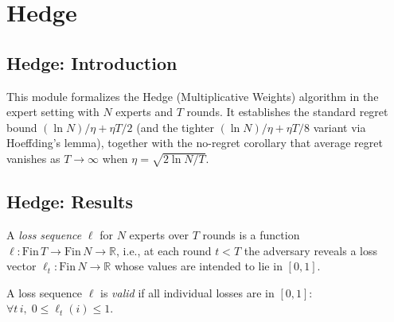 \section{Hedge}
\subsection*{Hedge: Introduction}

This module formalizes the Hedge (Multiplicative Weights) algorithm in the expert
setting with $N$ experts and $T$ rounds.  It establishes the standard regret bound
$(\ln N)/\eta + \eta T/2$ (and the tighter $(\ln N)/\eta + \eta T/8$ variant via
Hoeffding's lemma), together with the no-regret corollary that average regret
vanishes as $T \to \infty$ when $\eta = \sqrt{2 \ln N / T}$.

\subsection*{Hedge: Results}

\begin{definition}
\label{LossSeq}
\leanok
A \emph{loss sequence} $\ell$ for $N$ experts over $T$ rounds is a function
$\ell : \mathrm{Fin}\,T \to \mathrm{Fin}\,N \to \mathbb{R}$, i.e., at each round
$t < T$ the adversary reveals a loss vector $\ell_t : \mathrm{Fin}\,N \to \mathbb{R}$
whose values are intended to lie in $[0,1]$.
\end{definition}

\begin{definition}
\label{LossSeq.Valid}
\leanok
{}
A loss sequence $\ell$ is \emph{valid} if all individual losses are in $[0,1]$:
$\forall t\,i,\; 0 \le \ell_t(i) \le 1$.
\end{definition}

